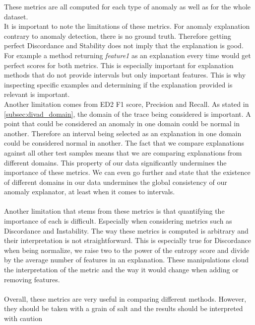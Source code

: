 \documentclass[oneside, a4paper, onecolumn, 11pt]{article}
\begin{document}
These metrics are all computed for each type of anomaly as well as for the whole dataset.\\
It is important to note the limitations of these metrics. For anomaly explanation contrary to anomaly detection, there is no ground truth. Therefore getting perfect Discordance and Stability does not imply that the explanation is good. For example a method returning \textit{feature1} as an explanation every time would get perfect scores for both metrics. This is especially important for explanation methods that do not provide intervals but only important features. This is why inspecting specific examples and determining if the explanation provided is relevant is important.\\
Another limitation comes from ED2 F1 score, Precision and Recall. As stated in \autoref{subsec:divad_domain}, the domain of the trace being considered is important. A point that could be considered an anomaly in one domain could be normal in another. Therefore an interval being selected as an explanation in one domain could be considered normal in another. The fact that we compare explanations against all other test samples means that we are comparing explanations from different domains. This property of our data significantly undermines the importance of these metrics.
We can even go further and state that the existence of different domains in our data undermines the global consistency of our anomaly explanator, at least when it comes to intervals.\\\\
Another limitation that stems from these metrics is that quantifying the importance of each is difficult. Especially when considering metrics such as Discordance and Instability. The way these metrics is computed is arbitrary and their interpretation is not straightforward. This is especially true for Discordance when being normalize, we raise two to the power of the entropy score and divide by the average number of features in an explanation. These manipulations cloud the interpretation of the metric and the way it would change when adding or removing features.\\\\
Overall, these metrics are very useful in comparing different methods. However, they should be taken with a grain of salt and the results should be interpreted with caution\\  
\end{document}
